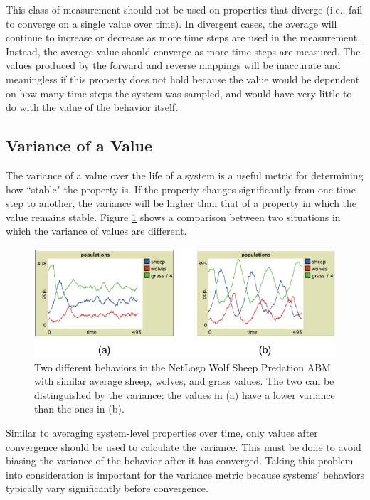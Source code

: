 This class of measurement should not be used on properties that diverge (i.e., fail to converge on a single value over time).
In divergent cases, the average will continue to increase or decrease as more time steps are used in the measurement.
Instead, the average value should converge as more time steps are measured.
The values produced by the forward and reverse mappings will be inaccurate and meaningless if this property does not hold because the value would be dependent on how many time steps the system was sampled, and would have very little to do with the value of the behavior itself.

\subsection{Variance of a Value}
The variance of a value over the life of a system is a useful metric for determining how ``stable" the property is.
If the property changes significantly from one time step to another, the variance will be higher than that of a property in which the value remains stable.
Figure \ref{fig:variance_compare} shows a comparison between two situations in which the variance of values are different.

\begin{figure}[ht]
\centering
\includegraphics{images/variance_comparison.pdf}
\caption{Two different behaviors in the NetLogo Wolf Sheep Predation ABM with similar average sheep, wolves, and grass values. The two can be distinguished by the variance: the values in (a) have a lower variance than the ones in (b).}
\label{fig:variance_compare}
\end{figure}

Similar to averaging system-level properties over time, only values after convergence should be used to calculate the variance.
This must be done to avoid biasing the variance of the behavior after it has converged.
Taking this problem into consideration is important for the variance metric because systems' behaviors typically vary significantly before convergence.

